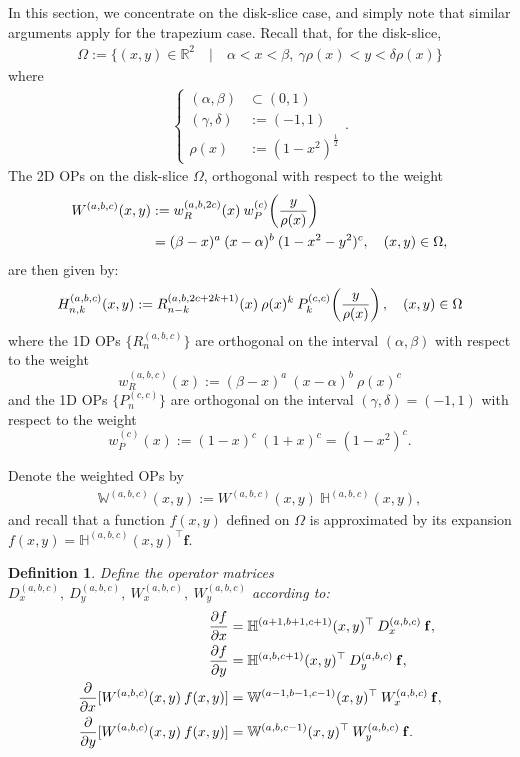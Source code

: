 \documentclass[11pt, oneside]{article}   	%
\newcommand{\half}{\frac{1}{2}}
\newcommand{\R}{\mathbb{R}}
\newcommand{\hdop}{H}
\newcommand{\bighdop}{\mathbb{\hdop}}
\newcommand{\jac}{{P}}
\newcommand{\genjac}{R}
\newcommand{\genjacnmk}{\genjac_{n-k}}
\newcommand{\genjacw}{w_\genjac}
\newcommand{\jacw}{w_P}
\newcommand{\bigW}{\mathbb{W}}
\newcommand{\hdopnkabc}{\hdop_{n,k}^{(a,b,c)}}
\newcommand{\Wabc}{{W^{(a,b,c)}}}
\newcommand{\bighdopabc}{\bighdop^{(a,b,c)}}
\newcommand{\bigWabc}{\mathbb{W}^{(a,b,c)}}
\newtheorem{definition}{Definition}
\begin{document}
In this section, we concentrate on the disk-slice case, and simply note that similar arguments apply for the trapezium case. Recall that, for the disk-slice,
\begin{align*}
	\Omega := \{(x,y) \in \R^2 \quad | \quad \alpha < x < \beta, \: \gamma \rho(x) < y < \delta \rho(x)\}
\end{align*}
where
\begin{align*}
\begin{cases}
	(\alpha,\beta) &\subset (0,1) \\
	(\gamma,\delta) &:= (-1,1) \\
	\rho(x) &:= (1-x^2)^{\half}
\end{cases}.
\end{align*}
The 2D OPs on the disk-slice $\Omega$, orthogonal with respect to the weight
\begin{align*}
	\Wabc(x,y) &:= \genjacw^{(a,b,2c)}(x) \: \jacw^{(c)}\fpr(\frac{y}{\rho(x)}) \\
	&= (\beta - x)^a \: (x - \alpha)^b \: (1-x^2-y^2)^c, \quad (x,y) \in \Omega,
\end{align*}
are then given by:
\begin{align*}
	\hdopnkabc(x,y) := \genjacnmk^{(a, b, 2c+2k+1)}(x) \: \rho(x)^k \: \jac_k^{(c,c)}\fpr(\frac{y}{\rho(x)}), \quad (x,y) \in \Omega
\end{align*}
where the 1D OPs $\{\genjac^{(a, b, c)}_n\}$ are orthogonal on the interval $(\alpha, \beta)$ with respect to the weight
$$
\genjacw^{(a,b,c)}(x) :=  (\beta - x)^a \: (x - \alpha)^b \: \rho(x)^{c}
$$
and the 1D OPs $\{\jac^{(c, c)}_n\}$ are orthogonal on the interval $(\gamma, \delta) = (-1, 1)$ with respect to the weight
$$
\jacw^{(c)}(x) := (1-x)^c \: (1+x)^c = (1-x^2)^c.
$$

Denote the weighted OPs by
\begin{align*}
\bigWabc(x,y) := \Wabc(x,y) \: \bighdopabc(x,y),
\end{align*}
and recall that a function $f(x,y)$ defined on $\Omega$ is approximated by its expansion $f(x,y) = \bighdopabc(x,y)^\top \mathbf{f}$. 

\begin{definition}\label{def:differentialoperators}
Define the operator matrices $D_x^{(a,b,c)}, \: D_y^{(a,b,c)}, \: W_x^{(a,b,c)}, \: W_y^{(a,b,c)}$ according to:
\begin{align*}
{\partial f \over \partial x}&= \bighdop^{(a+1,b+1,c+1)}(x,y)^\top \: D_x^{(a,b,c)} \: \mathbf{f}, \\
{\partial f \over \partial y} &= \bighdop^{(a,b,c+1)}(x,y)^\top \: D_y^{(a,b,c)} \: \mathbf{f}, \\
{\partial \over \partial x}[\Wabc(x,y) \: f(x,y)] &= \bigW^{(a-1,b-1,c-1)}(x,y)^\top \: W_x^{(a,b,c)} \: \mathbf{f}, \\
{\partial \over \partial y}[\Wabc(x,y) \: f(x,y)] &= \bigW^{(a,b,c-1)}(x,y)^\top \: W_y^{(a,b,c)} \: \mathbf{f}.
\end{align*}
\end{definition}
\end{document}
